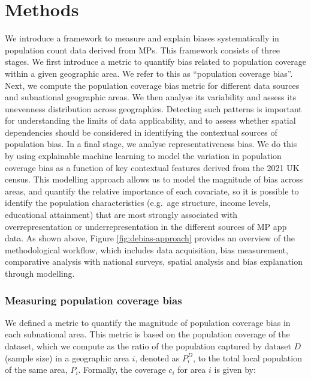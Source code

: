 \documentclass[]{rsos}%
\begin{document}
\section{Methods}\label{methods}

We introduce a framework to measure and explain biases systematically in
population count data derived from MPs. This framework
consists of three stages. We first introduce a metric to quantify bias
related to population coverage within a given geographic area. We
refer to this as ``population coverage bias''. Next, we compute the
population coverage bias metric for different data sources and
subnational geographic areas. We then analyse its variability and assess
its unevenness distribution across geographies. Detecting such patterns
is important for understanding the limits of data applicability, and to
assess whether spatial dependencies should be considered in identifying
the contextual sources of population bias. In a final stage, we analyse
representativeness bias. We do this by using explainable machine
learning to model the variation in population coverage bias as a function of key
contextual features derived from the 2021 UK census. This modelling
approach allows us to model the magnitude of bias across areas, and
quantify the relative importance of each covariate, so it is possible to
identify the population characteristics (e.g.~age structure, income
levels, educational attainment) that are most strongly associated with
overrepresentation or underrepresentation in the different sources of MP
app data. As shown above, Figure \ref{fig:debias-approach} provides an overview of the methodological workflow,
which includes data acquisition, bias measurement, comparative analysis
with national surveys, spatial analysis and bias explanation through
modelling.

\subsubsection{Measuring population coverage bias}\label{measuring-population-coverage-bias}

We defined a metric to quantify the magnitude of population coverage bias in each
subnational area. This metric is based on the population coverage of the
dataset, which we compute as the ratio of the population captured by
dataset \(D\) (sample size) in a geographic area \(i\), denoted as \(P_i^D\),
to the total local population of the same area, \(P_i\). Formally, the
coverage \(c_i\) for area \(i\) is given by:
\end{document}
